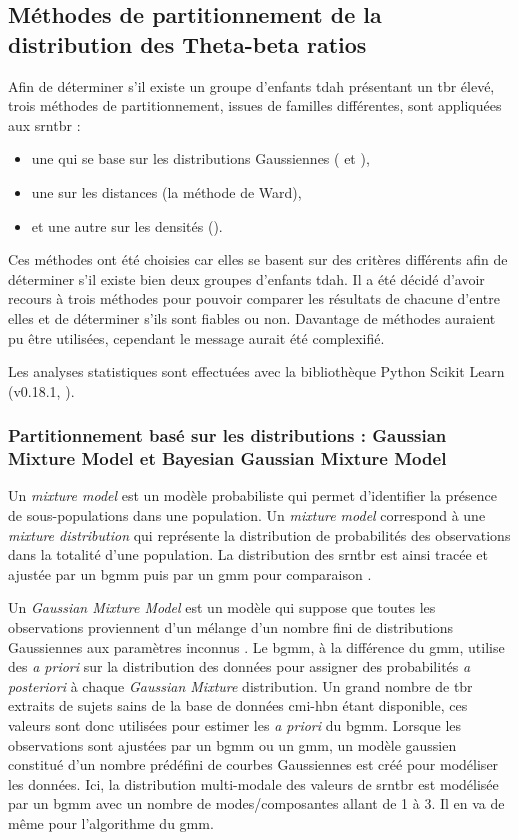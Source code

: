 \subsection{Méthodes de partitionnement de la distribution des Theta-beta ratios} \label{clustering}

Afin de déterminer s'il existe un groupe d'enfants \gls{tdah} présentant un \gls{tbr} élevé, trois méthodes de partitionnement, issues de familles différentes,
sont appliquées aux \gls{srntbr} : 
\begin{itemize}
\item une qui se base sur les distributions Gaussiennes ( et ), 
\item une sur les distances (la méthode de Ward),
\item et une autre sur les densités (). 
\end{itemize}

Ces méthodes ont été choisies car elles se basent sur des critères différents afin de déterminer s'il existe bien deux groupes d'enfants \gls{tdah}. Il a été décidé
d'avoir recours à trois méthodes pour pouvoir comparer les résultats de chacune d'entre elles et de déterminer s'ils sont fiables ou non. Davantage de méthodes auraient pu
être utilisées, cependant le message aurait été complexifié.   

Les analyses statistiques sont effectuées avec la bibliothèque Python Scikit Learn (v0.18.1, \citet{Pedregosa2011}).

\subsubsection{Partitionnement basé sur les distributions : Gaussian Mixture Model et Bayesian Gaussian Mixture Model} 
Un \textit{mixture model} est un modèle probabiliste qui permet d'identifier la présence de sous-populations dans une population. Un \textit{mixture model}
correspond à une \textit{mixture distribution} qui représente la distribution de probabilités des observations dans la totalité d'une population.
La distribution des \gls{srntbr} est ainsi tracée et ajustée par un \gls{bgmm} puis par un \gls{gmm} pour comparaison \citep{Attias2000, Blei2006}. 

Un \textit{Gaussian Mixture Model} est un modèle qui suppose que toutes les observations proviennent d'un mélange 
d'un nombre fini de distributions Gaussiennes aux paramètres inconnus \citep{Yu2016}. 
Le \gls{bgmm}, à la différence du \gls{gmm}, utilise des \textit{a priori} sur la distribution des données pour 
assigner des probabilités \textit{a posteriori} à chaque \textit{Gaussian Mixture} distribution. Un grand nombre de \gls{tbr} 
extraits de sujets sains de la base de données \gls{cmi-hbn} étant disponible, ces valeurs sont donc utilisées pour estimer les \textit{a priori} du \gls{bgmm}. 
Lorsque les observations sont ajustées par un \gls{bgmm} ou un \gls{gmm}, un modèle gaussien constitué d'un nombre prédéfini de courbes Gaussiennes est 
créé pour modéliser les données. Ici, la distribution multi-modale des valeurs de \gls{srntbr} est modélisée par un \gls{bgmm} avec un nombre 
de modes/composantes allant de 1 à 3. 
Il en va de même pour l'algorithme du \gls{gmm}. 

